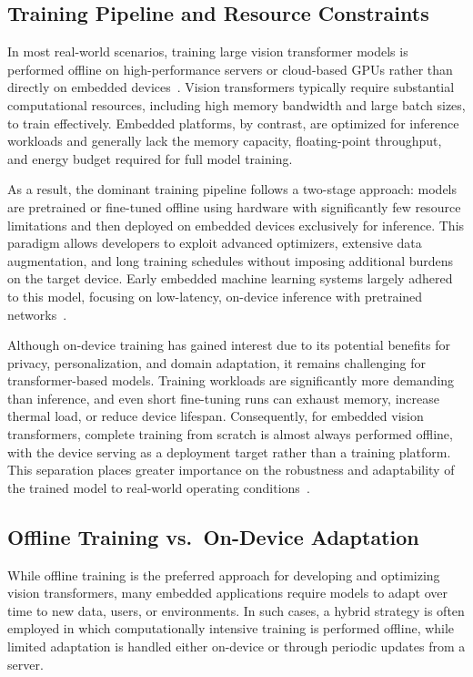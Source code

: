 \documentclass[runningheads,a4paper]{llncs}
\begin{document}
\subsection{Training Pipeline and Resource Constraints}
In most real-world scenarios, training large vision transformer models is performed offline on high-performance servers or cloud-based GPUs rather than directly on embedded devices~\cite{mlsys2023ondevice_chapter,ambient2025training_vs_inference}. Vision transformers typically require substantial computational resources, including high memory bandwidth and large batch sizes, to train effectively. Embedded platforms, by contrast, are optimized for inference workloads and generally lack the memory capacity, floating-point throughput, and energy budget required for full model training.

As a result, the dominant training pipeline follows a two-stage approach: models are pretrained or fine-tuned offline using hardware with significantly few resource limitations and then deployed on embedded devices exclusively for inference. This paradigm allows developers to exploit advanced optimizers, extensive data augmentation, and long training schedules without imposing additional burdens on the target device. Early embedded machine learning systems largely adhered to this model, focusing on low-latency, on-device inference with pretrained networks~\cite{mlsys2023ondevice_chapter}.

Although on-device training has gained interest due to its potential benefits for privacy, personalization, and domain adaptation, it remains challenging for transformer-based models. Training workloads are significantly more demanding than inference, and even short fine-tuning runs can exhaust memory, increase thermal load, or reduce device lifespan. Consequently, for embedded vision transformers, complete training from scratch is almost always performed offline, with the device serving as a deployment target rather than a training platform. This separation places greater importance on the robustness and adaptability of the trained model to real-world operating conditions~\cite{zhu2024ondevice_training_survey,mlsys2023ondevice_chapter}.

\subsection{Offline Training vs.\ On-Device Adaptation}
While offline training is the preferred approach for developing and optimizing vision transformers, many embedded applications require models to adapt over time to new data, users, or environments. In such cases, a hybrid strategy is often employed in which computationally intensive training is performed offline, while limited adaptation is handled either on-device or through periodic updates from a server.
\end{document}
